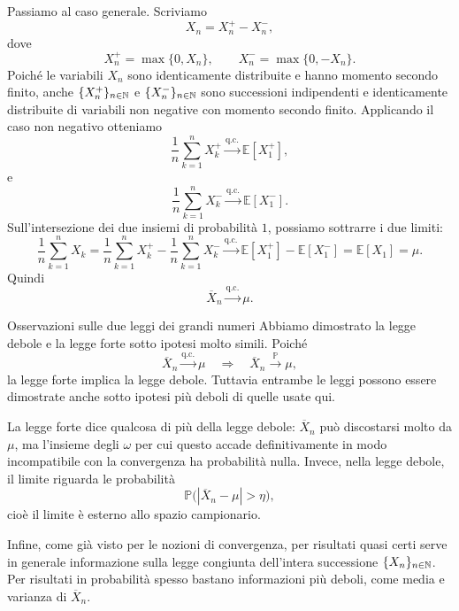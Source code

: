 \documentclass[a4paper]{article}
\begin{document}
\begin{snippetproof}{}
    Passiamo al caso generale. Scriviamo
    \[
        X_n=X_n^+-X_n^-,
    \]
    dove
    \[
        X_n^+=\max\{0,X_n\},
        \qquad
        X_n^-=\max\{0,-X_n\}.
    \]
    Poiché le variabili \(X_n\) sono identicamente distribuite e hanno momento secondo finito, anche \(\{X_n^+\}_{n\in\mathbb{N}}\) e \(\{X_n^-\}_{n\in\mathbb{N}}\) sono successioni indipendenti e identicamente distribuite di variabili non negative con momento secondo finito. Applicando il caso non negativo otteniamo
    \[
        \frac1n\sum_{k=1}^{n}X_k^+
        \xrightarrow{\text{q.c.}}
        \mathbb{E}[X_1^+],
    \]
    e
    \[
        \frac1n\sum_{k=1}^{n}X_k^-
        \xrightarrow{\text{q.c.}}
        \mathbb{E}[X_1^-].
    \]
    Sull'intersezione dei due insiemi di probabilità \(1\), possiamo sottrarre i due limiti:
    \[
        \frac1n\sum_{k=1}^{n}X_k
        =
        \frac1n\sum_{k=1}^{n}X_k^+
        -
        \frac1n\sum_{k=1}^{n}X_k^-
        \xrightarrow{\text{q.c.}}
        \mathbb{E}[X_1^+]-\mathbb{E}[X_1^-]
        =
        \mathbb{E}[X_1]
        =
        \mu.
    \]
    Quindi
    \[
        \overline{X}_n\xrightarrow{\text{q.c.}}\mu.
    \]
\end{snippetproof}

\begin{snippetremark}{Osservazioni sulle due leggi dei grandi numeri}
    Abbiamo dimostrato la legge debole e la legge forte sotto ipotesi molto simili. Poiché
    \[
        \overline{X}_n\xrightarrow{\text{q.c.}}\mu
        \quad
        \Longrightarrow
        \quad
        \overline{X}_n\xrightarrow{\mathbb{P}}\mu,
    \]
    la legge forte implica la legge debole. Tuttavia entrambe le leggi possono essere dimostrate anche sotto ipotesi più deboli di quelle usate qui.

    La legge forte dice qualcosa di più della legge debole: \(\overline{X}_n\) può discostarsi molto da \(\mu\), ma l'insieme degli \(\omega\) per cui questo accade definitivamente in modo incompatibile con la convergenza ha probabilità nulla. Invece, nella legge debole, il limite riguarda le probabilità
    \[
        \mathbb{P}\bigl(|\overline{X}_n-\mu|>\eta\bigr),
    \]
    cioè il limite è esterno allo spazio campionario.

    Infine, come già visto per le nozioni di convergenza, per risultati quasi certi serve in generale informazione sulla legge congiunta dell'intera successione \(\{X_n\}_{n\in\mathbb{N}}\). Per risultati in probabilità spesso bastano informazioni più deboli, come media e varianza di \(\overline{X}_n\).
\end{snippetremark}
\end{document}
